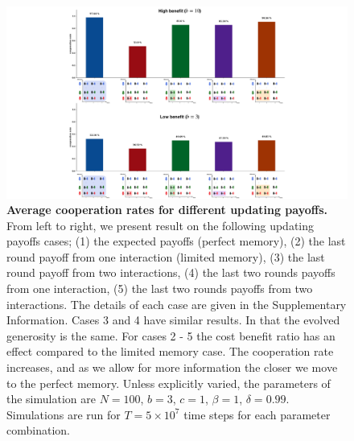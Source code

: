 \documentclass[11pt]{article}
\theoremstyle{plainCl1}
\theoremstyle{plainCl2}
\begin{document}
\begin{figure}[!htbp]
  \centering
  \includegraphics[width=\textwidth]{static/more_memory_summary_results.pdf}
  \caption{{\bf Average cooperation rates for different updating payoffs.}
  From left to right, we present result on the following updating payoffs cases;
  (1) the expected payoffs (perfect memory), (2) the last round payoff from one
  interaction (limited memory), (3) the last round payoff from two interactions,
  (4) the last two rounds payoffs from one interaction, (5) the last two rounds
  payoffs from two interactions. The details of each case are given in the
  Supplementary Information. Cases 3 and 4 have similar results. In that the
  evolved generosity is the same. For cases 2 - 5 the cost benefit ratio
  has an effect compared to the limited memory case. The cooperation rate
  increases, and as we allow for more information the closer we move to the
  perfect memory. Unless explicitly varied, the parameters of the simulation are
  $N\!=\!100$, $b\!=\!3$, $c\!=\!1$, $\beta\!=\!1$, $\delta\!=\!0.99$.
  Simulations are run for $T\!=\!5\times 10^7$ time steps for each parameter
  combination.}\label{fig:cooperation_rate_all_updating_payoffs}
\end{figure}

\newpage

\end{document}
